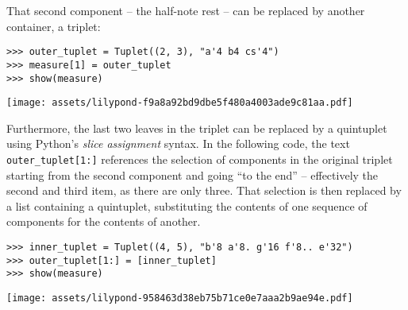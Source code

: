 That second component -- the half-note rest -- can be replaced by
another container, a triplet:

\begin{comment}
<abjad>
outer_tuplet = Tuplet((2, 3), "a'4 b4 cs'4")
measure[1] = outer_tuplet
show(measure)
</abjad>
\end{comment}

\begin{abjadbookoutput}
\begin{singlespacing}
\vspace{-0.5\baselineskip}
\begin{lstlisting}
>>> outer_tuplet = Tuplet((2, 3), "a'4 b4 cs'4")
>>> measure[1] = outer_tuplet
>>> show(measure)
\end{lstlisting}
\noindent\texttt{[image: assets/lilypond-f9a8a92bd9dbe5f480a4003ade9c81aa.pdf]}
\end{singlespacing}
\end{abjadbookoutput}

Furthermore, the last two leaves in the triplet can be replaced by a quintuplet
using Python's \emph{slice assignment} syntax. In the following code, the text
\texttt{outer\_tuplet[1:]} references the selection of components in the
original triplet starting from the second component and going \enquote{to the
end} -- effectively the second and third item, as there are only three. That
selection is then replaced by a list containing a quintuplet, substituting the
contents of one sequence of components for the contents of another.

\begin{comment}
<abjad>
inner_tuplet = Tuplet((4, 5), "b'8 a'8. g'16 f'8.. e'32")
outer_tuplet[1:] = [inner_tuplet]
show(measure)
</abjad>
\end{comment}

\begin{abjadbookoutput}
\begin{singlespacing}
\vspace{-0.5\baselineskip}
\begin{lstlisting}
>>> inner_tuplet = Tuplet((4, 5), "b'8 a'8. g'16 f'8.. e'32")
>>> outer_tuplet[1:] = [inner_tuplet]
>>> show(measure)
\end{lstlisting}
\noindent\texttt{[image: assets/lilypond-958463d38eb75b71ce0e7aaa2b9ae94e.pdf]}
\end{singlespacing}
\end{abjadbookoutput}

